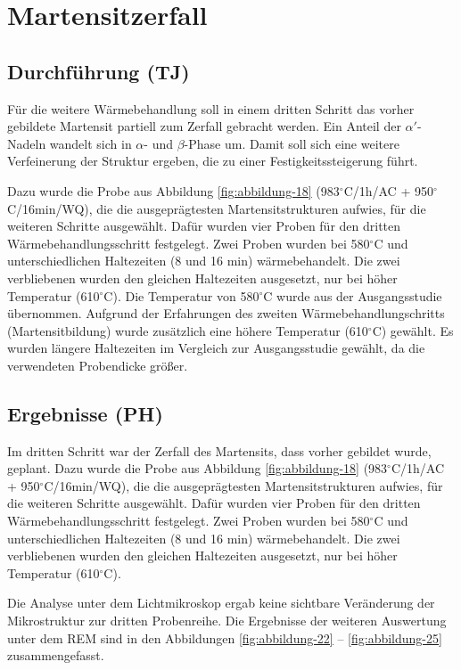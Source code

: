 \chapter{Martensitzerfall}

\section{Durchführung (TJ)}

Für die weitere Wärmebehandlung soll in einem dritten Schritt das vorher gebildete Martensit partiell zum Zerfall gebracht werden. Ein Anteil der $\alpha'$-Nadeln wandelt sich in $\alpha$- und $\beta$-Phase um. Damit soll sich eine weitere Verfeinerung der Struktur ergeben, die zu einer Festigkeitssteigerung führt.

Dazu wurde die Probe aus Abbildung \ref{fig:abbildung-18} (983$^\circ$C/1h/AC + 950$^\circ$C/16min/WQ), die die ausgeprägtesten Martensitstrukturen aufwies, für die weiteren Schritte ausgewählt. 
Dafür wurden vier Proben für den dritten Wärmebehandlungsschritt festgelegt. Zwei Proben wurden bei 580$^\circ$C und unterschiedlichen Haltezeiten (8 und 16 min) wärmebehandelt. Die zwei verbliebenen wurden den gleichen Haltezeiten ausgesetzt, nur bei höher Temperatur (610$^\circ$C).
Die Temperatur von 580$^\circ$C wurde aus der Ausgangsstudie übernommen. Aufgrund der Erfahrungen des zweiten Wärmebehandlungschritts (Martensitbildung) wurde zusätzlich eine höhere Temperatur (610$^\circ$C) gewählt.
Es wurden längere Haltezeiten im Vergleich zur Ausgangsstudie gewählt, da die verwendeten Probendicke größer.

\section{Ergebnisse (PH)}

Im dritten Schritt war der Zerfall des Martensits, dass vorher gebildet wurde, geplant. Dazu wurde die Probe aus Abbildung \ref{fig:abbildung-18} (983$^\circ$C/1h/AC + 950$^\circ$C/16min/WQ), die die ausgeprägtesten Martensitstrukturen aufwies, für die weiteren Schritte ausgewählt. 
Dafür wurden vier Proben für den dritten Wärmebehandlungsschritt festgelegt. Zwei Proben wurden bei 580$^\circ$C und unterschiedlichen Haltezeiten (8 und 16 min) wärmebehandelt. Die zwei verbliebenen wurden den gleichen Haltezeiten ausgesetzt, nur bei höher Temperatur (610$^\circ$C).

Die Analyse unter dem Lichtmikroskop ergab keine sichtbare Veränderung der Mikrostruktur zur dritten Probenreihe. Die Ergebnisse der weiteren Auswertung unter dem REM sind in den Abbildungen \ref{fig:abbildung-22} -- \ref{fig:abbildung-25} zusammengefasst.

